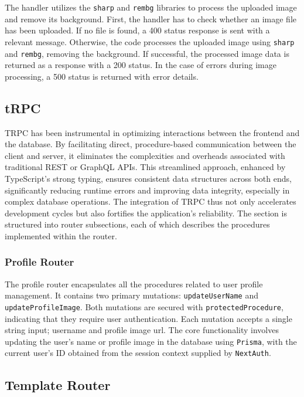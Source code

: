 The handler utilizes the \texttt{sharp} and \texttt{rembg} libraries to process the uploaded image and remove its background. First, the handler has to check whether an image file has been uploaded. If no file is found, a 400 status response is sent with a relevant message. Otherwise, the code processes the uploaded image using \texttt{sharp} and \texttt{rembg}, removing the background. If successful, the processed image data is returned as a response with a 200 status. In the case of errors during image processing, a 500 status is returned with error details.

\subsection{tRPC}

TRPC has been instrumental in optimizing interactions between the frontend and the database. By facilitating direct, procedure-based communication between the client and server, it eliminates the complexities and overheads associated with traditional REST or GraphQL APIs. This streamlined approach, enhanced by TypeScript's strong typing, ensures consistent data structures across both ends, significantly reducing runtime errors and improving data integrity, especially in complex database operations. The integration of TRPC thus not only accelerates development cycles but also fortifies the application's reliability.\cite{trpc} The section is structured into router subsections, each of which describes the procedures implemented within the router.

\subsubsection{Profile Router}

The profile router encapsulates all the procedures related to user profile management. It contains two primary mutations: \texttt{updateUserName} and \texttt{updateProfileImage}. Both mutations are secured with \texttt{protectedProcedure}, indicating that they require user authentication. Each mutation accepts a single string input; username and profile image \acrshort{url}. The core functionality involves updating the user's name or profile image in the database using \texttt{Prisma}, with the current user's ID obtained from the session context supplied by \texttt{NextAuth}.

\subsection{Template Router}

